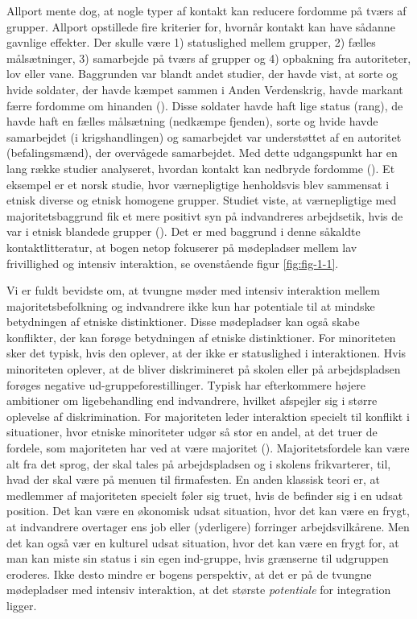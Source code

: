 \documentclass[
]{book}
\begin{document}
Allport mente dog, at nogle typer af kontakt kan reducere fordomme på tværs af grupper. Allport opstillede fire kriterier for, hvornår kontakt kan have sådanne gavnlige effekter. Der skulle være 1) statuslighed mellem grupper, 2) fælles målsætninger, 3) samarbejde på tværs af grupper og 4) opbakning fra autoriteter, lov eller vane. Baggrunden var blandt andet studier, der havde vist, at sorte og hvide soldater, der havde kæmpet sammen i Anden Verdenskrig, havde markant færre fordomme om hinanden (). Disse soldater havde haft lige status (rang), de havde haft en fælles målsætning (nedkæmpe fjenden), sorte og hvide havde samarbejdet (i krigshandlingen) og samarbejdet var understøttet af en autoritet (befalingsmænd), der overvågede samarbejdet. Med dette udgangspunkt har en lang række studier analyseret, hvordan kontakt kan nedbryde fordomme (). Et eksempel er et norsk studie, hvor værnepligtige henholdsvis blev sammensat i etnisk diverse og etnisk homogene grupper. Studiet viste, at værnepligtige med majoritetsbaggrund fik et mere positivt syn på indvandreres arbejdsetik, hvis de var i etnisk blandede grupper (). Det er med baggrund i denne såkaldte kontaktlitteratur, at bogen netop fokuserer på mødepladser mellem lav frivillighed og intensiv interaktion, se ovenstående figur \ref{fig:fig-1-1}.

Vi er fuldt bevidste om, at tvungne møder med intensiv interaktion mellem majoritetsbefolkning og indvandrere ikke kun har potentiale til at mindske betydningen af etniske distinktioner. Disse mødepladser kan også skabe konflikter, der kan forøge betydningen af etniske distinktioner. For minoriteten sker det typisk, hvis den oplever, at der ikke er statuslighed i interaktionen. Hvis minoriteten oplever, at de bliver diskrimineret på skolen eller på arbejdspladsen forøges negative ud-gruppeforestillinger. Typisk har efterkommere højere ambitioner om ligebehandling end indvandrere, hvilket afspejler sig i større oplevelse af diskrimination. For majoriteten leder interaktion specielt til konflikt i situationer, hvor etniske minoriteter udgør så stor en andel, at det truer de fordele, som majoriteten har ved at være majoritet (). Majoritetsfordele kan være alt fra det sprog, der skal tales på arbejdspladsen og i skolens frikvarterer, til, hvad der skal være på menuen til firmafesten. En anden klassisk teori er, at medlemmer af majoriteten specielt føler sig truet, hvis de befinder sig i en udsat position. Det kan være en økonomisk udsat situation, hvor det kan være en frygt, at indvandrere overtager ens job eller (yderligere) forringer arbejdsvilkårene. Men det kan også vær en kulturel udsat situation, hvor det kan være en frygt for, at man kan miste sin status i sin egen ind-gruppe, hvis grænserne til udgruppen eroderes. Ikke desto mindre er bogens perspektiv, at det er på de tvungne mødepladser med intensiv interaktion, at det største \emph{potentiale} for integration ligger.
\end{document}
